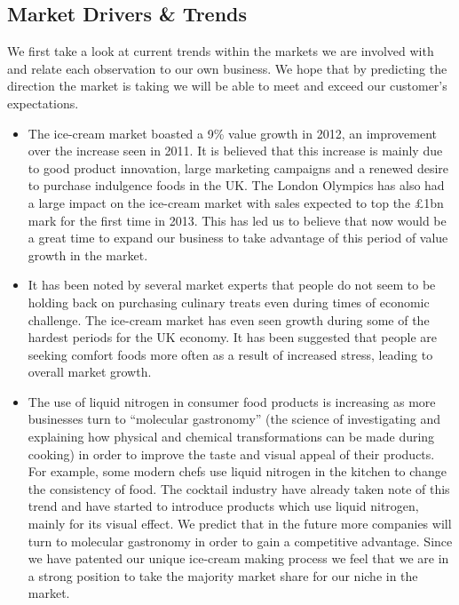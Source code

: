 \documentclass{article}
\begin{document}
  \subsection{Market Drivers \& Trends}

   We first take a look at current trends within the markets we are involved with and relate each observation to our own business. We hope that by predicting the direction the market is taking we will be able to meet and exceed our customer's expectations.
   
  \begin{itemize}
  \item The ice-cream market boasted a 9\% value growth in 2012, an improvement over the increase seen in 2011. It is believed that this increase is mainly due to good product innovation, large marketing campaigns and a renewed desire to purchase indulgence foods in the UK. The London Olympics has also had a large impact on the ice-cream market with sales expected to top the \pounds 1bn mark for the first time in 2013. This has led us to believe that now would be a great time to expand our business to take advantage of this period of value growth in the market.

  \item It has been noted by several market experts that people do not seem to be holding back on purchasing culinary treats even during times of economic challenge. The ice-cream market has even seen growth during some of the hardest periods for the UK economy. It has been suggested that people are seeking comfort foods more often as a result of increased stress, leading to overall market growth.

  \item The use of liquid nitrogen in consumer food products is increasing as more businesses turn to  ``molecular gastronomy'' (the science of investigating and explaining how physical and chemical transformations can be made during cooking) in order to improve the taste and visual appeal of their products. For example, some modern chefs use liquid nitrogen in the kitchen to change the consistency of food. The cocktail industry have already taken note of this trend and have started to introduce products which use liquid nitrogen, mainly for its visual effect. We predict that in the future more companies will turn to molecular gastronomy in order to gain a competitive advantage. Since we have patented our unique ice-cream making process we feel that we are in a strong position to take the majority market share for our niche in the market. 


\end{itemize}
\end{document}
